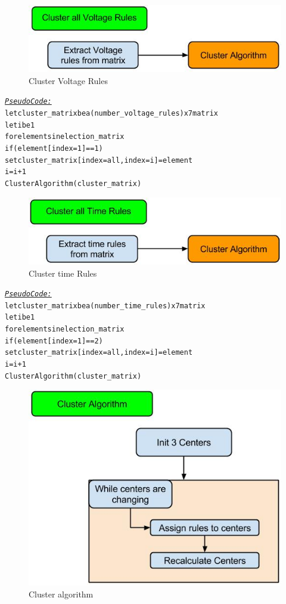 \documentclass[a4paper]{article}
\begin{document}
\begin{figure}[!ht]
\includegraphics[width =\textwidth]{Cluster_voltage.jpg}
\caption{Cluster Voltage Rules}
\label{cluster_voltage}
\end{figure}
\begin{alltt}
 \underline{\textit{Pseudo Code:}}
let cluster_matrix be a (number_voltage_rules)x7 matrix 
let i be 1
for elements in election_matrix
    if (element[index = 1] == 1)
        set cluster_matrix[index = all, index = i] = element
        i = i + 1
Cluster Algorithm(cluster_matrix)
\end{alltt}
\newpage
\begin{figure}[!ht]
\includegraphics[width =\textwidth]{cluster_time.jpg}
\caption{Cluster time Rules}
\label{cluster_time}
\end{figure}

\begin{alltt}
 \underline{\textit{Pseudo Code:}}
let cluster_matrix be a (number_time_rules)x7 matrix 
let i be 1
for elements in election_matrix
    if (element[index = 1] == 2)
        set cluster_matrix[index = all, index = i] = element
        i = i + 1
Cluster Algorithm(cluster_matrix)
\end{alltt}


\begin{figure}[!ht]
\includegraphics[width =\textwidth]{cluster_algorithm.jpg}
\caption{Cluster algorithm}
\label{cluster_algorithm}
\end{figure}
\end{document}
